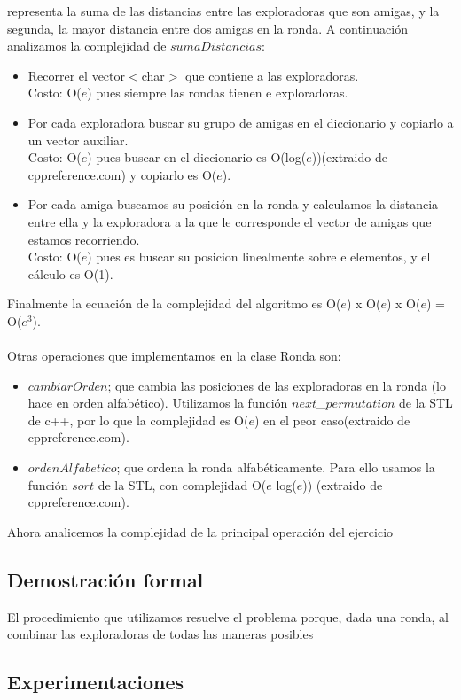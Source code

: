 representa la suma de las distancias entre las exploradoras que son amigas, y la segunda, la mayor distancia entre dos amigas en 
la ronda. A continuación analizamos la complejidad de $sumaDistancias$: 
\begin{itemize}
\item Recorrer el vector$<$char$>$ que contiene a las exploradoras. \\
Costo: O($e$) pues siempre las rondas tienen e exploradoras.
\item Por cada exploradora buscar su grupo de amigas en el diccionario y copiarlo a un vector auxiliar. \\
Costo: O($e$) pues buscar en el diccionario es O(log($e$))(extraido de cppreference.com) y copiarlo es O($e$).
\item Por cada amiga buscamos su posición en la ronda y calculamos la distancia entre ella y la exploradora a la que le corresponde el vector de amigas que estamos recorriendo. \\
Costo: O($e$) pues es buscar su posicion linealmente sobre e elementos, y el cálculo es O(1).
\end{itemize}
Finalmente la ecuación de la complejidad del algoritmo es O($e$) x O($e$) x O($e$) = O($e^3$). \\
\\
Otras operaciones que implementamos en la clase Ronda son: 
\begin{itemize}
\item $cambiarOrden$; que cambia las posiciones de las exploradoras en la ronda (lo hace en orden alfabético). Utilizamos la función 
$next$\_$permutation$ de la STL de c++, por lo que la complejidad es O($e$) en el peor caso(extraido de cppreference.com). 
\item $ordenAlfabetico$; que ordena la ronda alfabéticamente. Para ello usamos la función $sort$ de la STL, con complejidad
O($e$ log($e$)) (extraido de cppreference.com).
\end{itemize}

Ahora analicemos la complejidad de la principal operación del ejercicio

\subsection{Demostración formal}
El procedimiento que utilizamos resuelve el problema porque, dada una ronda, al combinar las exploradoras de todas las maneras 
posibles

\subsection{Experimentaciones}